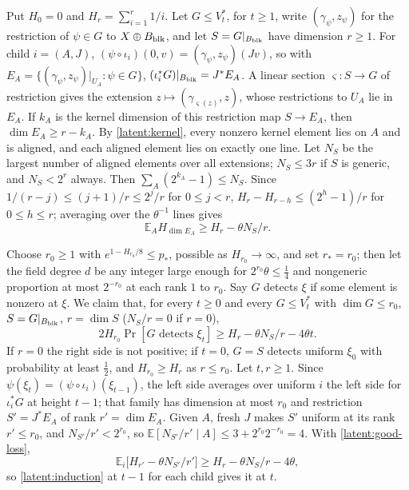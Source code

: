 \documentclass[11pt]{article}
\newcommand{\E}{\mathbb E}
\begin{document}
Put $H_0=0$ and $H_r=\sum_{i=1}^r1/i$. Let $G\le V_t^*$, for $t\ge1$, write
$(\gamma_\psi,z_\psi)$ for the restriction of $\psi\in G$ to $X\oplus
B_{\rm blk}$, and let $S=G|_{B_{\rm blk}}$ have dimension $r\ge1$. For
child $i=(A,J)$, $(\psi\circ\iota_i)(0,v)=(\gamma_\psi,z_\psi)(Jv)$, so
with $E_A=\{(\gamma_\psi,z_\psi)|_{U_A}:\psi\in G\}$,
$(\iota_i^*G)|_{B_{\rm blk}}=J^*E_A$. A linear section $\varsigma:S\to G$
of restriction gives the extension $z\mapsto(\gamma_{\varsigma(z)},z)$,
whose restrictions to $U_A$ lie in $E_A$. If $k_A$ is the kernel dimension
of this restriction map $S\to E_A$, then $\dim E_A\ge r-k_A$. By
\eqref{latent:kernel}, every nonzero kernel element lies on $A$ and is
aligned, and each aligned element lies on exactly one line. Let $N_S$ be
the largest number of aligned elements over all extensions; $N_S\le3r$ if
$S$ is generic, and $N_S<2^r$ always. Then $\sum_A(2^{k_A}-1)\le N_S$.
Since $1/(r-j)\le(j+1)/r\le2^j/r$ for $0\le j<r$, $H_r-H_{r-h}\le(2^h-1)/r$
for $0\le h\le r$; averaging over the $\theta^{-1}$ lines gives
\begin{equation}
 \E_AH_{\dim E_A}\ge H_r-\theta N_S/r.
 \label{latent:good-loss}
\end{equation}

Choose $r_0\ge1$ with $e^{1-H_{r_0}/8}\le p_*$, possible as $H_{r_0}\to\infty$,
and set $r_*=r_0$; then let the field degree $d$ be any integer large enough
for $2^{r_0}\theta\le\frac14$ and nongeneric proportion at most $2^{-r_0}$ at
each rank $1$ to $r_0$. Say $G$
detects $\xi$ if some element is nonzero at $\xi$. We claim that, for every
$t\ge0$ and every $G\le V_t^*$ with $\dim G\le r_0$, $S=G|_{B_{\rm blk}}$,
$r=\dim S$ ($N_S/r=0$ if $r=0$),
\begin{equation}
 2H_{r_0}\Pr[G\text{ detects }\xi_t]\ge H_r-\theta N_S/r-4\theta t.
 \label{latent:induction}
\end{equation}
If $r=0$ the right side is not positive; if $t=0$, $G=S$ detects uniform
$\xi_0$ with probability at least $\frac12$, and $H_{r_0}\ge H_r$ as $r\le
r_0$. Let $t,r\ge1$. Since $\psi(\xi_t)=(\psi\circ\iota_i)(\xi_{t-1})$, the
left side averages over uniform $i$ the left side for $\iota_i^*G$ at
height $t-1$; that family has dimension at most $r_0$ and restriction
$S'=J^*E_A$ of rank $r'=\dim E_A$. Given $A$, fresh $J$ makes $S'$ uniform
at its rank $r'\le r_0$, and $N_{S'}/r'<2^{r_0}$, so $\E[N_{S'}/r'\mid
A]\le3+2^{r_0}2^{-r_0}=4$. With \eqref{latent:good-loss},
\[
 \E_i\bigl[H_{r'}-\theta N_{S'}/r'\bigr]\ge H_r-\theta N_S/r-4\theta,
\]
so \eqref{latent:induction} at $t-1$ for each child gives it at $t$.
\end{document}

